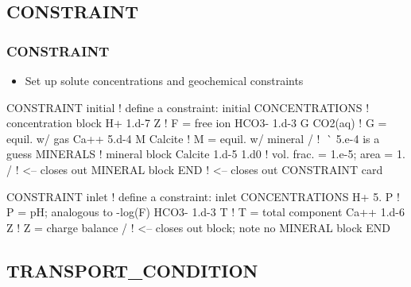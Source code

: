 \documentclass{beamer}
\newcommand\redcomment[1]{{{\color{red} #1}}}
\newcommand\bluecomment[1]{{{\color{blue} #1}}}
\newcommand\greencomment[1]{{{\color{green} #1}}}
\begin{document}
\subsection{CONSTRAINT}

\begin{frame}\frametitle{CONSTRAINT}

\begin{itemize}
  \item Set up solute concentrations and geochemical constraints
\end{itemize}

\begin{semiverbatim}

CONSTRAINT initial      \bluecomment{! define a constraint: \greencomment{initial}}
  CONCENTRATIONS           \bluecomment{! concentration block}
    H+     1.d-7      Z    \bluecomment{! \redcomment{F} = free ion}
    HCO3-  1.d-3      G  CO2(aq) \bluecomment{! \redcomment{G} = equil. w/ gas}
    Ca++   5.d-4      M  Calcite \bluecomment{! \redcomment{M} = equil. w/ mineral}
  /  \bluecomment{    ! ^^^^^ \redcomment{5.e-4} is a guess}
  MINERALS               \bluecomment{! mineral block}
    Calcite 1.d-5 1.d0   \bluecomment{! vol. frac. = \redcomment{1.e-5}; area = \redcomment{1.}}
  /  \bluecomment{! <-- closes out MINERAL block}
END  \bluecomment{! <-- closes out CONSTRAINT card}

\newpage
CONSTRAINT inlet         \bluecomment{! define a constraint: \greencomment{inlet}}
  CONCENTRATIONS
    H+     5.         P  \bluecomment{! \redcomment{P} = pH; analogous to -log(F)}
    HCO3-  1.d-3      T  \bluecomment{! \redcomment{T} = total component}
    Ca++   1.d-6      Z  \bluecomment{! \redcomment{Z} = charge balance}
  /  \bluecomment{! <-- closes out block; \redcomment{note no MINERAL block}}
END

\end{semiverbatim}

\end{frame}

\subsection{TRANSPORT\_CONDITION}
\end{document}
